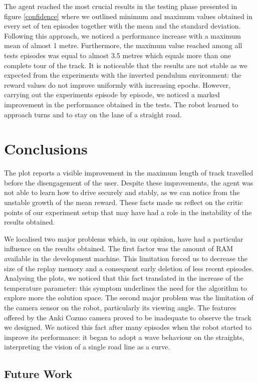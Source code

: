 \documentclass[10pt,twocolumn,letterpaper]{article}
\begin{document}
The agent reached the most crucial results in the testing phase presented in figure \ref{confidence} where we outlined minimum and maximum values obtained in every set of ten episodes together with the mean and the standard deviation.
Following this approach, we noticed a performance increase with a maximum mean of almost 1 metre.
Furthermore, the maximum value reached among all tests episodes was equal to almost 3.5 metres which equals more than one complete tour of the track.
It is noticeable that the results are not stable as we expected from the experiments with the inverted pendulum environment: the reward values do not improve uniformly with increasing epochs.
However, carrying out the experiments episode by episode, we noticed a marked improvement in the performance obtained in the tests. The robot learned to approach turns and to stay on the lane of a straight road.

\section{Conclusions}

The plot reports a visible improvement in the maximum length of track travelled before the disengagement of the user.
Despite these improvements, the agent was not able to learn how to drive securely and stably, as we can notice from the unstable growth of the mean reward.
These facts made us reflect on the critic points of our experiment setup that may have had a role in the instability of the results obtained.

We localised two major problems which, in our opinion, have had a particular influence on the results obtained.
The first factor was the amount of RAM available in the development machine. This limitation forced us to decrease the size of the replay memory and a consequent early deletion of less recent episodes. Analysing the plots, we noticed that this fact translated in the increase of the temperature parameter: this symptom underlines the need for the algorithm to explore more the solution space.
The second major problem was the limitation of the camera sensor on the robot, particularly its viewing angle. The features offered by the Anki Cozmo camera proved to be inadequate to observe the track we designed.
We noticed this fact after many episodes when the robot started to improve its performance: it began to adopt a wave behaviour on the straights, interpreting the vision of a single road line as a curve.

\subsection{Future Work}
\end{document}
